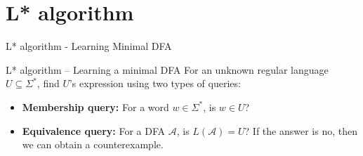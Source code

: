 \documentclass{beamer}
\begin{document}
\section{L* algorithm}
\begin{frame}{L* algorithm - Learning Minimal DFA}
\begin{block}{L* algorithm -- Learning a minimal DFA}
For an unknown regular language $U \subseteq \Sigma^*$, find $U$'s expression using two types of queries:\cite{angluin87}
\begin{itemize}
    \item \textbf{Membership query:} For a word $w \in \Sigma^*$, is $w \in U$?
    \item \textbf{Equivalence query:} For a DFA $\mathcal{A}$, is $L(\mathcal{A}) = U$? If the answer is no, then we can obtain a counterexample. 
\end{itemize}
\end{block}



\end{frame}
\end{document}
